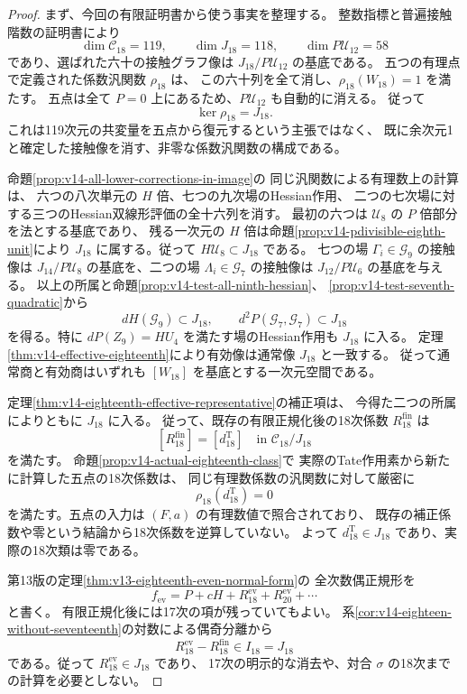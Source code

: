\documentclass[a4paper,11pt]{ltjsarticle}
\theoremstyle{definition}
\begin{document}
\begin{proof}
まず、今回の有限証明書から使う事実を整理する。
整数指標と普遍接触階数の証明書により
\[
 \dim\mathcal C_{18}=119,\qquad
 \dim J_{18}=118,\qquad \dim P\mathcal U_{12}=58
\]
であり、選ばれた六十の接触グラフ像は
$J_{18}/P\mathcal U_{12}$ の基底である。
五つの有理点で定義された係数汎関数 $\rho_{18}$ は、
この六十列を全て消し、$\rho_{18}(W_{18})=1$ を満たす。
五点は全て $P=0$ 上にあるため、$P\mathcal U_{12}$ も自動的に消える。
従って
\[
 \ker\rho_{18}=J_{18}.
\]
これは119次元の共変量を五点から復元するという主張ではなく、
既に余次元1と確定した接触像を消す、非零な係数汎関数の構成である。

命題\ref{prop:v14-all-lower-corrections-in-image}の
同じ汎関数による有理数上の計算は、
六つの八次単元の $H$ 倍、七つの九次場のHessian作用、
二つの七次場に対する三つのHessian双線形評価の全十六列を消す。
最初の六つは $\mathcal U_8$ の $P$ 倍部分を法とする基底であり、
残る一次元の $H$ 倍は命題\ref{prop:v14-pdivisible-eighth-unit}により
$J_{18}$ に属する。従って $H\mathcal U_8\subset J_{18}$ である。
七つの場 $\Gamma_i\in\mathcal G_9$ の接触像は
$J_{14}/P\mathcal U_8$ の基底を、二つの場
$\Lambda_i\in\mathcal G_7$ の接触像は
$J_{12}/P\mathcal U_6$ の基底を与える。
以上の所属と命題\ref{prop:v14-test-all-ninth-hessian}、
\ref{prop:v14-test-seventh-quadratic}から
\[
 dH(\mathcal G_9)\subset J_{18},\qquad
 d^2P(\mathcal G_7,\mathcal G_7)\subset J_{18}
\]
を得る。特に $dP(Z_9)=HU_4$ を満たす場のHessian作用も $J_{18}$ に入る。
定理\ref{thm:v14-effective-eighteenth}により有効像は通常像 $J_{18}$ と一致する。
従って通常商と有効商はいずれも $[W_{18}]$ を基底とする一次元空間である。

定理\ref{thm:v14-eighteenth-effective-representative}の補正項は、
今得た二つの所属によりともに $J_{18}$ に入る。
従って、既存の有限正規化後の18次係数 $R_{18}^{\mathrm{fin}}$ は
\[
 [R_{18}^{\mathrm{fin}}]=[d^{\mathrm T}_{18}]
      \quad\text{in }\mathcal C_{18}/J_{18}
\]
を満たす。
命題\ref{prop:v14-actual-eighteenth-class}で
実際のTate作用素から新たに計算した五点の18次係数は、
同じ有理数係数の汎関数に対して厳密に
\[
 \rho_{18}(d^{\mathrm T}_{18})=0
\]
を満たす。五点の入力は $(F,a)$ の有理数値で照合されており、
既存の補正係数や零という結論から18次係数を逆算していない。
よって $d^{\mathrm T}_{18}\in J_{18}$ であり、実際の18次類は零である。

第13版の定理\ref{thm:v13-eighteenth-even-normal-form}の
全次数偶正規形を
\[
 f_{\mathrm{ev}}=P+cH+R_{18}^{\mathrm{ev}}+R_{20}^{\mathrm{ev}}+\cdots
\]
と書く。
有限正規化後には17次の項が残っていてもよい。
系\ref{cor:v14-eighteen-without-seventeenth}の対数による偶奇分離から
\[
 R_{18}^{\mathrm{ev}}-R_{18}^{\mathrm{fin}}\in I_{18}=J_{18}
\]
である。従って $R_{18}^{\mathrm{ev}}\in J_{18}$ であり、
17次の明示的な消去や、対合 $\sigma$ の18次までの計算を必要としない。


\end{proof}
\end{document}
